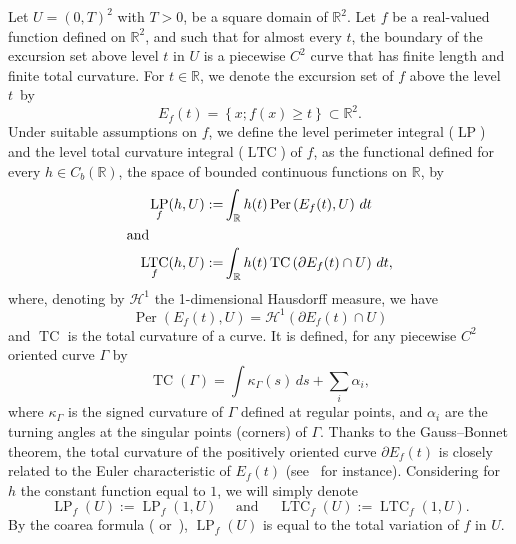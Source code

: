 \documentclass[10pt]{amsart}
\theoremstyle{definition}\newtheorem{defi}[theo]{Definition}\newtheorem{rema}[theo]{Remark}\newtheorem{exam}[theo]{Example}\newtheorem{exem}[theo]{Example}\newtheorem{nota}[theo]{Notation}
\newcommand{\R}{\mathbb{R}}
\DeclareMathOperator{\TC}{TC}
\DeclareMathOperator{\LTC}{LTC}
\DeclareMathOperator{\LP}{LP}
\DeclareMathOperator{\Per}{Per}
\newcommand{\calH}{\mathcal{H}}
\begin{document}
Let $U=(0,T)^2$ with $T>0$, be a square domain of $\R^2$. Let $f$ be a real-valued function defined on $\R^2$, and such that for almost every $t$, the boundary of the excursion set above level $t$ in $U$ is a piecewise $C^2$ curve that has finite length and finite total curvature. For $t\in\R$, we denote the excursion set of $f$ above the level~$t$~by
\[
E_f(t) =\left\{ x ; f(x) \geq t \right\} \subset \R^2.
\]
Under suitable assumptions on $f$, we define the level perimeter integral ($\LP$) and the level total curvature integral ($\LTC$) of $f$, as the functional defined for every $h\in C_b(\R)$, the space of bounded continuous functions on $\R$, by
\begin{align*}
\LP_f(h,U) :=& \int_\R h(t) \Per \left(E_f(t),U\right) \, dt \\
\intertext{and}
\quad \LTC_f(h,U) :=& \int_\R h(t) \TC \left(\partial E_f(t)\cap U\right) \, dt,
\end{align*}
where, denoting by $\calH^1$ the 1-dimensional Hausdorff measure, we have
\[
\Per \left(E_f(t),U\right)=\calH^1\left(\partial E_f(t)\cap U\right)
\]
and $\TC$ is the total curvature of a curve. It is defined, for any piecewise $C^2$ oriented curve $\Gamma$ by
\[
\TC(\Gamma) = \int \kappa_\Gamma (s) \, ds + \sum_i \alpha_i,
\]
where $\kappa_\Gamma$ is the signed curvature of $\Gamma$ defined at regular points, and $\alpha_i$ are the turning angles at the singular points (corners) of $\Gamma$. Thanks to the Gauss--Bonnet theorem, the total curvature of the positively oriented curve $\partial E_f(t)$ is closely related to the Euler characteristic of $E_f(t)$ (see~\cite[p.~274]{DoCarmo} for instance). Considering for $h$ the constant function equal to $1$, we will simply denote
\[
\LP_f(U) := \LP_f(1,U) \quad \text{ and } \quad \LTC_f(U) :=
\LTC_f(1,U).
\]
By the coarea formula (\cite{AmbrosioFP} or~\cite{EvansGariepy}), $\LP_f(U)$ is equal to the total variation of $f$ in $U$.
\end{document}

